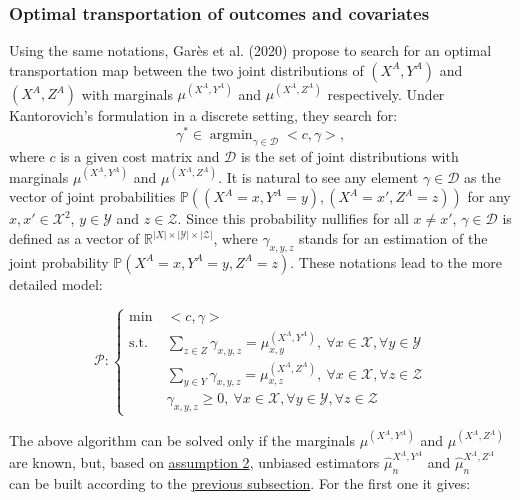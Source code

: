 \hypertarget{optimal-transportation-of-outcomes-and-covariates}{%
\subsubsection{Optimal transportation of outcomes and covariates}\label{optimal-transportation-of-outcomes-and-covariates}}

Using the same notations, Garès et al. (2020) propose to search for an optimal transportation map between the two joint distributions of \((X^A,Y^A)\) and \((X^A,Z^A)\) with marginals \(\mu^{(X^A,Y^A)}\) and \(\mu^{(X^A,Z^A)}\) respectively. Under Kantorovich's formulation in a discrete setting, they search for:
\[\gamma^*\in \operatorname{argmin}_{\gamma\in \mathcal{D}} <c,\gamma>,\]
where \(c\) is a given cost matrix and \(\mathcal{D}\) is the set of joint distributions with marginals \(\mu^{(X^A,Y^A)}\) and \(\mu^{(X^A,Z^A)}\). It is natural to see any element \(\gamma\in \mathcal{D}\) as the vector of joint probabilities \(\mathbb{P}((X^A=x,Y^A=y),(X^A=x',Z^A=z))\) for any \(x,x'\in\mathcal{X}^2\), \(y\in\mathcal{Y}\) and \(z\in\mathcal{Z}\). Since this probability nullifies for all \(x\neq x'\), \(\gamma\in \mathcal{D}\) is defined as a vector of \(\mathbb{R}^{\left\lvert X \right\rvert\times \left\lvert \mathcal{Y} \right\rvert \times\left\lvert\mathcal{Z} \right\rvert }\), where \(\gamma_{x,y,z}\) stands for an estimation of the joint probability \(\mathbb{P}(X^A=x,Y^A=y,Z^A=z)\).
These notations lead to the more detailed model:

\begin{equation}
    \mathcal{P}:\left\{
    \begin{aligned}
        \min\: & <c,\gamma> \\
                \text{s.t.}\:& \sum_{z\in Z} \gamma_{x,y,z} = \mu^{(X^A,Y^A)}_{x,y}, \:\forall x\in\mathcal{X}, \forall y\in \mathcal{Y}\\
                & \sum_{y\in Y} \gamma_{x,y,z} = \mu^{(X^A,Z^A)}_{x,z}, \:\forall x\in\mathcal{X}, \forall z\in \mathcal{Z}\\
                & \gamma_{x,y,z} \geq 0,  \:\forall x\in\mathcal{X}, \forall y\in \mathcal{Y}, \forall z\in \mathcal{Z}
    \end{aligned}\right.
\label{eq:jointkanto}
\end{equation}

The above algorithm can be solved only if the marginals \(\mu^{(X^A,Y^A)}\) and \(\mu^{(X^A,Z^A)}\) are known, but, based on \protect\hyperlink{optt}{assumption 2}, unbiased estimators \(\hat{\mu}^{X^A,Y^A}_n\) and \(\hat{\mu}^{X^A,Z^A}_n\) can be built according to the \protect\hyperlink{optt}{previous subsection}. For the first one it gives:

